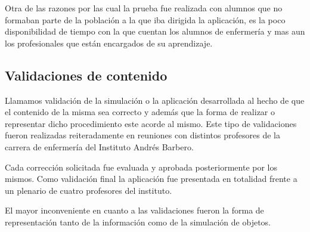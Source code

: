 Otra de las razones por las cual la prueba fue realizada con alumnos que no
formaban parte de la población a la que iba dirigida la aplicación, es la poco
disponibilidad de tiempo con la que cuentan los alumnos de enfermería y mas aun
los profesionales que están encargados de su aprendizaje.

\subsection{Validaciones de contenido}

Llamamos validación de la simulación o la aplicación desarrollada al hecho de
que el contenido de la misma sea correcto y además que la forma de realizar o
representar dicho procedimiento este acorde al mismo. Este tipo de validaciones
fueron realizadas reiteradamente en reuniones con distintos profesores de la
carrera de enfermería del Instituto Andrés Barbero.

Cada corrección solicitada fue evaluada y aprobada posteriormente por los
mismos. Como validación final la aplicación fue presentada en totalidad frente a
un plenario de cuatro profesores del instituto.

El mayor inconveniente en cuanto a las validaciones fueron la forma de
representación tanto de la información como de la simulación de objetos.

